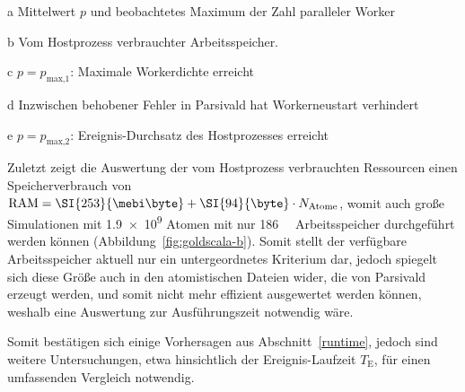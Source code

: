 \begin{table}[H]
\begin{threeparttable}
    \begin{tablenotes}
    \item[a] Mittelwert $p$ und beobachtetes Maximum der Zahl paralleler Worker
    \item[b] Vom Hostprozess verbrauchter Arbeitsspeicher.
    \item[c] $p = p_\text{max,1}$: Maximale Workerdichte erreicht
    \item[d] Inzwischen behobener Fehler in Parsivald hat Workerneustart verhindert
    \item[e] $p = p_\text{max,2}$: Ereignis-Durchsatz des Hostprozesses erreicht
    \end{tablenotes}

  \end{threeparttable}
\end{table}

Zuletzt zeigt die Auswertung der vom Hostprozess verbrauchten Ressourcen einen Speicherverbrauch von $\text{RAM} = \SI{253}{\mebi\byte} + \SI{94}{\byte} \cdot N_\text{Atome}$, womit auch große Simulationen mit \num{1.9e9} Atomen mit nur \SI{186}{\gibi\byte} Arbeitsspeicher durchgeführt werden können (Abbildung~\ref{fig:goldscala-b}).
Somit stellt der verfügbare Arbeitsspeicher aktuell nur ein untergeordnetes Kriterium dar, jedoch spiegelt sich diese Größe auch in den atomistischen Dateien wider, die von Parsivald erzeugt werden, und somit nicht mehr effizient ausgewertet werden können, weshalb eine Auswertung zur Ausführungszeit notwendig wäre.

Somit bestätigen sich einige Vorhersagen aus Abschnitt~\ref{runtime}, jedoch sind weitere Untersuchungen, etwa hinsichtlich der Ereignis-Laufzeit $T_\text{E}$, für einen umfassenden Vergleich notwendig.

\vspace{2em}

